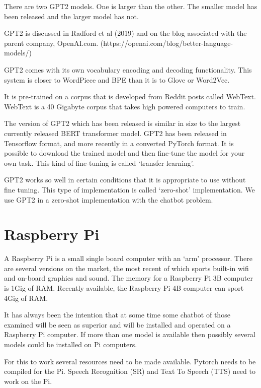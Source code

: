 There are two GPT2 models. One is larger than the other. The smaller model has been released and the larger model has not. 

GPT2 is discussed in Radford et al (2019)\cite{radford2019language} and on the blog associated with the parent company, OpenAI.com. (https://openai.com/blog/better-language-models/)

GPT2 comes with its own vocabulary encoding and decoding functionality. This system is closer to
WordPiece and BPE than it is to Glove or Word2Vec.

It is pre-trained on a corpus that is developed from Reddit posts called WebText. WebText is a
40 Gigabyte corpus that takes high powered computers to train.

The version of GPT2 which has been released is similar in size to the largest currently released 
BERT transformer model. GPT2 has been released in Tensorflow format, and more recently in a converted PyTorch format. It is possible to download the trained model and then fine-tune the model for your own task. This kind of fine-tuning is called `transfer learning'. 

GPT2 works so well in certain conditions that it is appropriate to use without fine tuning. This 
type of implementation is called `zero-shot' implementation. We use GPT2 in a zero-shot implementation with the chatbot problem.



\section{Raspberry Pi}

A Raspberry Pi is a small single board computer with an `arm' processor. There are 
several versions on the market, the most recent of which sports built-in wifi and
on-board graphics and sound. The memory for a Raspberry Pi 3B computer is 1Gig of RAM. Recently
available, the Raspberry Pi 4B computer can sport 4Gig of RAM.

It has always been the intention that at some time some chatbot of
those examined will be seen as superior and will be installed and
operated on a Raspberry Pi computer. If more than one model is available
then possibly several models could be installed on Pi computers.

For this to work several resources need to be made available. Pytorch
needs to be compiled for the Pi. Speech Recognition (\ac{SR}) and Text
To Speech (TTS) need to work on the Pi.

